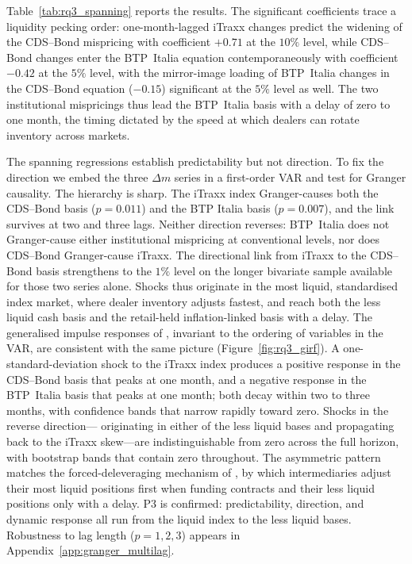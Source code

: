 Table~\ref{tab:rq3_spanning} reports the results. The significant
coefficients trace a liquidity pecking order: one-month-lagged iTraxx
changes predict the widening of the CDS--Bond mispricing with
coefficient $+0.71$ at the $10\%$ level, while CDS--Bond changes
enter the BTP~Italia equation contemporaneously with coefficient
$-0.42$ at the $5\%$ level, with the mirror-image loading of
BTP~Italia changes in the CDS--Bond equation ($-0.15$) significant at
the $5\%$ level as well. The two institutional
mispricings thus lead the BTP~Italia basis with a delay of zero to
one month, the timing dictated by the speed at which dealers can
rotate inventory across markets.

The spanning regressions establish predictability but not direction.
To fix the direction we embed the three $\Delta m$ series in a
first-order VAR and test for Granger causality. The hierarchy is
sharp. The iTraxx index Granger-causes both the CDS--Bond basis ($p=0.011$)
and the BTP Italia basis ($p=0.007$), and the link survives
at two and three lags. Neither direction reverses: BTP~Italia does
not Granger-cause either institutional mispricing at conventional
levels, nor does CDS--Bond Granger-cause iTraxx. The directional link from
iTraxx to the CDS--Bond basis strengthens to the $1\%$
level on the longer bivariate sample available for those two series
alone. Shocks thus originate in the most liquid, standardised
index market, where dealer inventory adjusts fastest, and reach both
the less liquid cash basis and the retail-held inflation-linked basis
with a delay. The generalised impulse responses of \citet{pesaran1998generalized},
invariant to the ordering of variables in the VAR, are consistent
with the same picture (Figure~\ref{fig:rq3_girf}). A
one-standard-deviation shock to the iTraxx index produces a positive
response in the CDS--Bond basis that peaks at one month, and a
negative response in the BTP~Italia basis that peaks at one month;
both decay within two to three months, with confidence bands that
narrow rapidly toward zero. Shocks in the reverse direction---
originating in either of the less liquid bases and propagating back
to the iTraxx skew---are indistinguishable from zero across the full
horizon, with bootstrap bands that contain zero throughout. The asymmetric pattern matches the forced-deleveraging
mechanism of \citet{mitchell2012arbitrage}, by which intermediaries
adjust their most liquid positions first when funding contracts and
their less liquid positions only with a delay.
P3 is confirmed: predictability, direction, and dynamic response all run
 from the liquid index to the less liquid bases. Robustness to lag length
($p = 1, 2, 3$) appears in Appendix~\ref{app:granger_multilag}.

